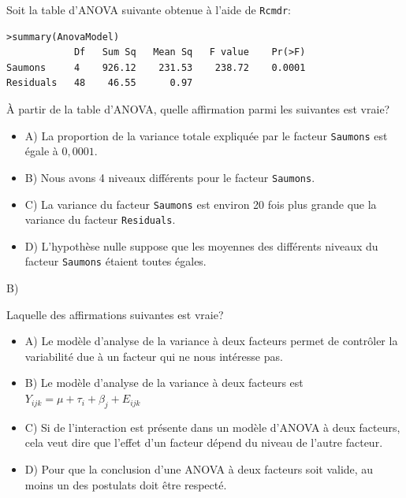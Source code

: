 \begin{questions}
\question[3] Soit la table d'ANOVA suivante obtenue à l'aide de \texttt{Rcmdr}:
\begin{verbatim}
>summary(AnovaModel)
            Df   Sum Sq   Mean Sq   F value    Pr(>F)    
Saumons     4    926.12    231.53    238.72    0.0001 
Residuals   48    46.55      0.97                      
\end{verbatim}

À partir de la table d'ANOVA, quelle affirmation parmi les suivantes est vraie?



\begin{itemize}[label = { }]
\item A) La proportion de la variance totale expliquée par le facteur \texttt{Saumons} est égale à $0,0001$. 
\item B) Nous avons 4 niveaux différents pour le facteur \texttt{Saumons}.
\item C) La variance du facteur \texttt{Saumons} est environ 20 fois plus grande que la variance du facteur \texttt{Residuals}.
\item D) L'hypothèse nulle suppose que les moyennes des différents niveaux du facteur \texttt{Saumons} étaient toutes égales.
\end{itemize}

 


\begin{solution}
B)
\end{solution}

\question[3] Laquelle des affirmations suivantes est vraie?
\begin{itemize}[label = {}]
\item A) Le modèle d'analyse de la variance à deux facteurs permet de contrôler la variabilité due à un facteur qui ne nous intéresse pas.
\item B) Le modèle d'analyse de la variance à deux facteurs est $Y_{ijk}=\mu+\tau_{i}+\beta_{j}+E_{ijk}$
\item C) Si de l'interaction est présente dans un modèle d'ANOVA à deux facteurs, cela veut dire que l'effet d'un facteur dépend du niveau de l'autre facteur.
\item D) Pour que la conclusion d'une ANOVA à deux facteurs soit valide, au moins un des postulats doit être respecté.
\end{itemize}
 



\end{questions}
